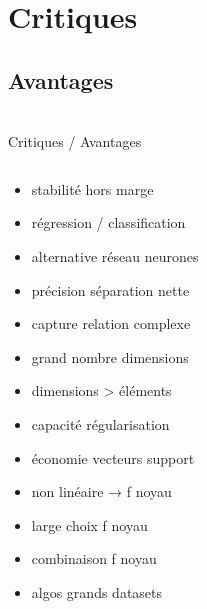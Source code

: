 \section{Critiques}
\subsection{Avantages}
\begin{frame}{\bititle\\Critiques / Avantages}
\begin{columns}\begin{column}{.5\textwidth}

\begin{itemize}
\item<1-> stabilité hors marge
\item<2-> régression / classification
\item<3-> alternative réseau neurones
\item<4-> précision séparation nette
\item<5-> capture relation complexe
\item<6-> grand nombre dimensions
\item<7-> dimensions > éléments
\item<8-> capacité régularisation
\item<9-> économie vecteurs support
\item<10-> non linéaire → f noyau
\item<11-> large choix f noyau
\item<12-> combinaison f noyau
\item<13-> algos grands datasets
\end{itemize}

\end{column}\begin{column}{.5\textwidth}


\end{column}\end{columns}
\end{frame}
